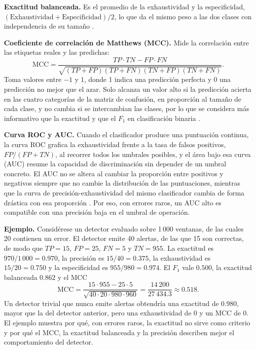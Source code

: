 \textbf{Exactitud balanceada.} Es el promedio de la exhaustividad y la especificidad, $(\mathrm{Exhaustividad} + \mathrm{Especificidad})/2$, lo que da el mismo peso a las dos clases con independencia de su tamaño \cite{diallo2025_metrics}.

\textbf{Coeficiente de correlación de Matthews (MCC).} Mide la correlación entre las etiquetas reales y las predichas:
\begin{equation}
\mathrm{MCC} = \frac{TP \cdot TN - FP \cdot FN}{\sqrt{(TP+FP)(TP+FN)(TN+FP)(TN+FN)}}.
\end{equation}
Toma valores entre $-1$ y $1$, donde 1 indica una predicción perfecta y 0 una predicción no mejor que el azar. Solo alcanza un valor alto si la predicción acierta en las cuatro categorías de la matriz de confusión, en proporción al tamaño de cada clase, y no cambia si se intercambian las clases, por lo que se considera más informativo que la exactitud y que el $F_1$ en clasificación binaria \cite{chicco2020_mcc}.

\textbf{Curva ROC y AUC.} Cuando el clasificador produce una puntuación continua, la curva ROC grafica la exhaustividad frente a la tasa de falsos positivos, $FP/(FP + TN)$, al recorrer todos los umbrales posibles, y el área bajo esa curva (AUC) resume la capacidad de discriminación sin depender de un umbral concreto. El AUC no se altera al cambiar la proporción entre positivos y negativos siempre que no cambie la distribución de las puntuaciones, mientras que la curva de precisión-exhaustividad del mismo clasificador cambia de forma drástica con esa proporción \cite{richardson2024_roc}. Por eso, con errores raros, un AUC alto es compatible con una precisión baja en el umbral de operación.

\textbf{Ejemplo.} Considérese un detector evaluado sobre 1\,000 ventanas, de las cuales 20 contienen un error. El detector emite 40 alertas, de las que 15 son correctas, de modo que $TP = 15$, $FP = 25$, $FN = 5$ y $TN = 955$. La exactitud es $970/1\,000 = 0.970$, la precisión es $15/40 = 0.375$, la exhaustividad es $15/20 = 0.750$ y la especificidad es $955/980 = 0.974$. El $F_1$ vale $0.500$, la exactitud balanceada $0.862$ y el MCC
\begin{equation}
\mathrm{MCC} = \frac{15 \cdot 955 - 25 \cdot 5}{\sqrt{40 \cdot 20 \cdot 980 \cdot 960}} = \frac{14\,200}{27\,434.3} \approx 0.518.
\end{equation}
Un detector trivial que nunca emite alertas obtendría una exactitud de $0.980$, mayor que la del detector anterior, pero una exhaustividad de 0 y un MCC de 0. El ejemplo muestra por qué, con errores raros, la exactitud no sirve como criterio y por qué el MCC, la exactitud balanceada y la precisión describen mejor el comportamiento del detector.

